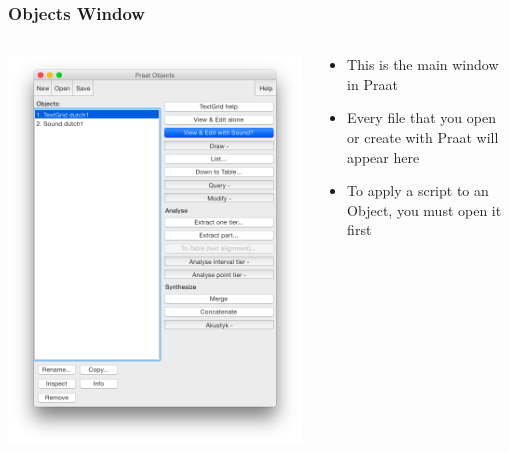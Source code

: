 \documentclass[handout]{beamer}
\begin{document}
\begin{frame}[fragile]
\frametitle{Objects Window}
    
\begin{columns}[]
  \begin{column}{0.5\textwidth}
    \includegraphics[width=\textwidth]{graphics/objectswindow.png}
  \end{column}

  \begin{column}{0.5\textwidth}
    \begin{itemize}
        \item <1-> This is the main window in Praat
        \item <2-> Every file that you open or create with Praat will appear here
        \item <3-> To apply a script to an Object, you must open it first
    \end{itemize}
  \end{column}
\end{columns}

\end{frame}
\end{document}
